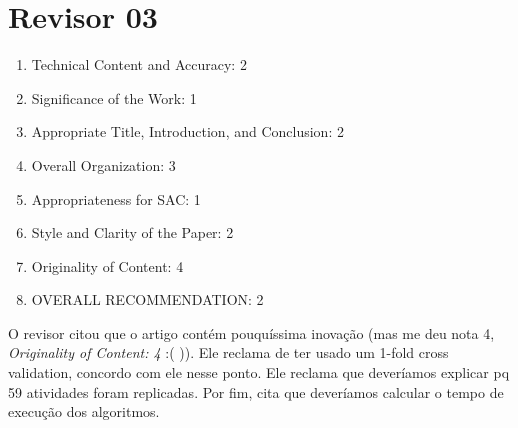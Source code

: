 \section{Revisor 03}
\begin{frame}
	\begin{enumerate}
		\item Technical Content and Accuracy: 2
		\item Significance of the Work: 1
		\item Appropriate Title, Introduction, and Conclusion: 2
		\item Overall Organization: 3
		\item Appropriateness for SAC: 1
		\item Style and Clarity of the Paper: 2
		\item Originality of Content: 4
		\item OVERALL RECOMMENDATION: 2
	\end{enumerate}
	O revisor citou que o artigo contém pouquíssima inovação (mas me deu nota 4, \emph{Originality of Content: 4} :( )). Ele reclama de ter usado um 1-fold cross validation, concordo com ele nesse ponto. Ele reclama que deveríamos explicar pq 59 atividades foram replicadas. Por fim, cita que deveríamos calcular o tempo de execução dos algoritmos.
\end{frame}

